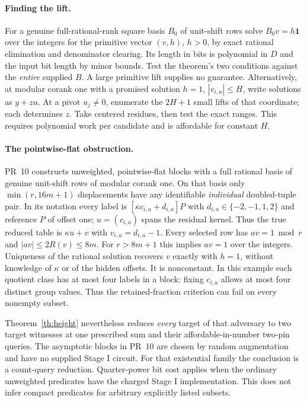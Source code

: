 \documentclass[11pt]{article}
\begin{document}
\paragraph{Finding the lift.}
For a genuine full-rational-rank square basis $B_0$ of unit-shift rows solve $B_0v=h\mathbf1$ over the integers for the primitive vector $(v,h)$, $h>0$, by exact rational elimination and denominator clearing. Its length in bits is polynomial in $D$ and the input bit length by minor bounds. Test the theorem's two conditions against the \emph{entire} supplied $B$. A large primitive lift supplies no guarantee. Alternatively, at modular corank one with a promised solution $h=1$, $|v_{i,a}|\le H$, write solutions as $y+z u$. At a pivot $u_j\ne0$, enumerate the $2H+1$ small lifts of that coordinate; each determines $z$. Take centered residues, then test the exact ranges. This requires polynomial work per candidate and is affordable for constant $H$.

\paragraph{The pointwise-flat obstruction.}
PR~10 \cite{prten} constructs unweighted, pointwise-flat blocks with a full rational basis of genuine unit-shift rows of modular corank one. On that basis only $\min(r,16m+1)$ displacements have any identifiable \emph{individual} doubled-tuple pair. In its notation every label is $[\kappa c_{i,a}+d_{i,a}]P$ with $d_{i,a}\in\{-2,-1,1,2\}$ and reference $P$ of offset one; $u=(c_{i,a})$ spans the residual kernel. Thus the true reduced table is $\kappa u+v$ with $v_{i,a}=d_{i,a}-1$. Every selected row has $av=1\bmod r$ and $|av|\le2R(v)\le8m$. For $r>8m+1$ this implies $av=1$ over the integers. Uniqueness of the rational solution recovers $v$ exactly with $h=1$, without knowledge of $\kappa$ or of the hidden offsets. It is nonconstant. In this example each quotient class has at most four labels in a block: fixing $c_{i,a}$ allows at most four distinct group values. Thus the retained-fraction criterion can fail on every nonempty subset.

Theorem~\ref{th:height} nevertheless reduces \emph{every} target of that adversary to two target witnesses at one prescribed sum and their affordable-in-number two-pin queries. The asymptotic blocks in PR~10 are chosen by random augmentation and have no supplied Stage I circuit. For that existential family the conclusion is a count-query reduction. Quarter-power bit cost applies when the ordinary unweighted predicates have the charged Stage I implementation. This does not infer compact predicates for arbitrary explicitly listed subsets.
\end{document}
